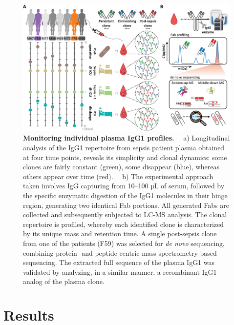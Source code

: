 \begin{figure}[!htb]
  \center
  \includegraphics[]{Chapter.3/Figures/f1.png}
  \caption{
    \textbf{Monitoring individual plasma IgG1 profiles.} ~~a) Longitudinal analysis of the IgG1 repertoire from sepsis patient plasma obtained at four time points, reveals its simplicity and clonal dynamics: some clones are fairly constant (green), some disappear (blue), whereas others appear over time (red). ~~b) The experimental approach taken involves IgG capturing from 10–100 μL of serum, followed by the specific enzymatic digestion of the IgG1 molecules in their hinge region, generating two identical Fab portions. All generated Fabs are collected and subsequently subjected to LC-MS analysis. The clonal repertoire is profiled, whereby each identified clone is characterized by its unique mass and retention time. A single post-sepsis clone from one of the patients (F59) was selected for \emph{de novo} sequencing, combining protein- and peptide-centric mass-spectrometry-based sequencing. The extracted full sequence of the plasma IgG1 was validated by analyzing, in a similar manner, a recombinant IgG1 analog of the plasma clone.
  }
  \label{fig:fig3.1}
\end{figure}


\section{Results}

